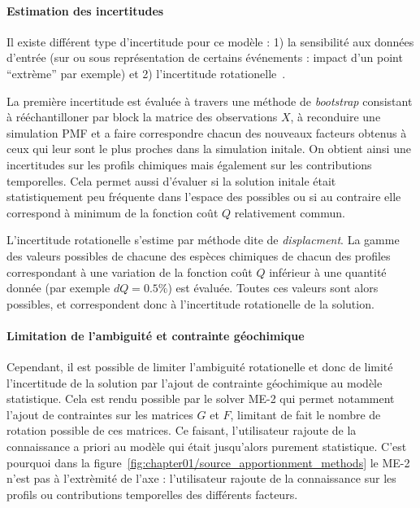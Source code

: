 \paragraph{Estimation des incertitudes}%
\label{par:incertitudes}

Il existe différent type d'incertitude pour ce modèle : 1) la sensibilité aux données
d'entrée (sur ou sous représentation de certains événements : impact d'un point
``extrème'' par exemple) et 2) l'incertitude rotationelle~\autocite{brownMethods2015}.

La première incertitude est évaluée à travers une méthode de \textit{bootstrap} consistant
à rééchantilloner par block la matrice des observations $X$, à reconduire une simulation
PMF et a faire correspondre chacun des nouveaux facteurs obtenus à ceux qui leur sont le
plus proches dans la simulation initale.
On obtient ainsi une incertitudes sur les profils chimiques mais également sur les
contributions temporelles.
Cela permet aussi d'évaluer si la solution initale était statistiquement peu fréquente
dans l'espace des possibles ou si au contraire elle correspond à minimum de la fonction
coût $Q$ relativement commun.

L'incertitude rotationelle s'estime par méthode dite de \textit{displacment}. La gamme des
valeurs possibles de chacune des espèces chimiques de chacun des profiles correspondant à
une variation de la fonction coût $Q$ inférieur à une quantité donnée (par exemple $dQ =
0.5\%$) est évaluée. Toutes ces valeurs sont alors possibles, et correspondent donc à
l'incertitude rotationelle de la solution.

\paragraph{Limitation de l'ambiguité et contrainte géochimique}%
\label{par:limitation_de_l_ambiguité_et_contrainte_géochimique}

Cependant, il est possible de limiter l'ambiguité rotationelle et donc de limité
l'incertitude de la solution par l'ajout de contrainte géochimique au modèle statistique.
Cela est rendu possible par le solver ME-2 qui permet notamment l'ajout de contraintes
sur les matrices $G$ et $F$, limitant de fait le nombre de rotation possible de ces
matrices. Ce faisant, l'utilisateur rajoute de la connaissance a priori au modèle qui
était jusqu'alors purement statistique. C'est pourquoi dans la
figure~\ref{fig:chapter01/source_apportionment_methods} le ME-2 n'est pas à l'extrèmité de
l'axe : l'utilisateur rajoute de la connaissance sur les profils ou contributions
temporelles des différents facteurs.

